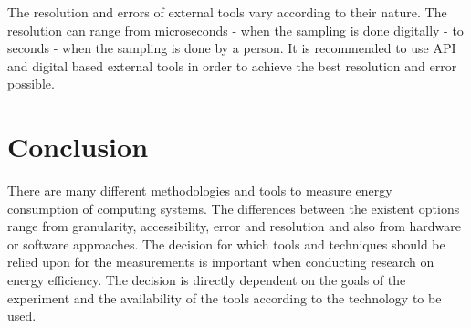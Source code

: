 The resolution and errors of external tools vary according to their nature. The resolution can range from microseconds - when the sampling is done digitally - to seconds - when the sampling is done by a person. It is recommended to use API and digital based external tools in order to achieve the best resolution and error possible. 


\section*{Conclusion}
There are many different methodologies and tools to measure energy consumption of computing systems. The differences between the existent options range from granularity, accessibility, error and resolution and also from hardware or software approaches. The decision for which tools and techniques should be relied upon for the measurements is important when conducting research on energy efficiency. The decision is directly dependent on the goals of the experiment and the availability of the tools according to the technology to be used. 
